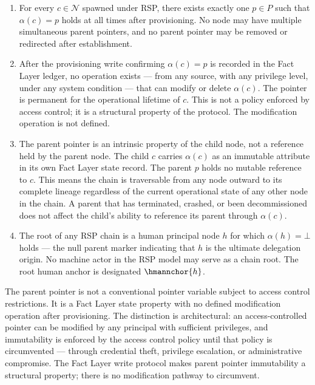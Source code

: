 \begin{enumerate}
\item[(P1) \textbf{Uniqueness}] For every $c \in \mathcal{N}$ spawned under RSP, there exists exactly one $p \in P$ such that $\alpha(c) = p$ holds at all times after provisioning. No node may have multiple simultaneous parent pointers, and no parent pointer may be removed or redirected after establishment.

\item[(P2) \textbf{Immutability}] After the provisioning write confirming $\alpha(c) = p$ is recorded in the Fact Layer ledger, no operation exists --- from any source, with any privilege level, under any system condition --- that can modify or delete $\alpha(c)$. The pointer is permanent for the operational lifetime of $c$. This is not a policy enforced by access control; it is a structural property of the protocol. The modification operation is not defined.

\item[(P3) \textbf{Directionality}] The parent pointer is an intrinsic property of the child node, not a reference held by the parent node. The child $c$ carries $\alpha(c)$ as an immutable attribute in its own Fact Layer state record. The parent $p$ holds no mutable reference to $c$. This means the chain is traversable from any node outward to its complete lineage regardless of the current operational state of any other node in the chain. A parent that has terminated, crashed, or been decommissioned does not affect the child's ability to reference its parent through $\alpha(c)$.

\item[(P4) \textbf{Termination at Human Anchor}] The root of any RSP chain is a human principal node $h$ for which $\alpha(h) = \bot$ holds --- the null parent marker indicating that $h$ is the ultimate delegation origin. No machine actor in the RSP model may serve as a chain root. The root human anchor is designated $\hmannchor{h}$.
\end{enumerate}

The parent pointer is not a conventional pointer variable subject to access control restrictions. It is a Fact Layer state property with no defined modification operation after provisioning. The distinction is architectural: an access-controlled pointer can be modified by any principal with sufficient privileges, and immutability is enforced by the access control policy until that policy is circumvented --- through credential theft, privilege escalation, or administrative compromise. The Fact Layer write protocol makes parent pointer immutability a structural property; there is no modification pathway to circumvent.


